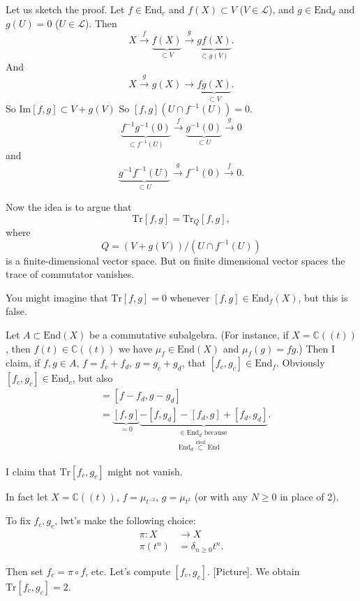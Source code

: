 Let us sketch the proof.
Let $f \in \text{End}_c$ and $f(X) \subset V$ 
($V \in \mathcal{L}$),
and $g \in \text{End}_d$ and $g(U)=0$
($U \in \mathcal{L}$).
Then
$$
X \xrightarrow{f}\underbrace{f(X)}_{\subset V}\xrightarrow{g}
\underbrace{gf(X)}_{\subset g(V)}.
$$
And
$$
X \xrightarrow{g}g(X) \to \underbrace{fg(X)}_{\subset V}.
$$
So $\text{Im}[f,g] \subset V+g(V)$
So $[f,g](U \cap f^{-1}(U))=0$.
$$
\underbrace{f^{-1}g^{-1}(0)}_{\subset f^{-1}(U)}
\xrightarrow{f}\underbrace{g^{-1}(0)}
_{\subset U}\xrightarrow{g}0
$$
and 
$$
\underbrace{g^{-1}f^{-1}(U)}_{\subset U}
\xrightarrow{g}f^{-1}(0)\xrightarrow{f}0.
$$

\noindent
Now the idea is to argue that
$$
\text{Tr}[f,g]=\text{Tr}_Q[f,g],
$$
where
$$
Q=(V+g(V))/(U\cap f^{-1}(U))
$$
is a finite-dimensional vector space.
But on finite dimensional vector spaces
the trace of commutator vanishes.

\medskip\noindent
You might imagine that $\text{Tr}[f,g]=0$
whenever $[f,g]\in \text{End}_f(X)$,
but this is false.

\begin{example}
\label{example-trace-of-commutator-not-vanishing}
Let $A \subset \text{End} (X)$ be a commutative subalgebra.
(For instance, if $X= \mathbb{C}((t))$,
then $f(t) \in \mathbb{C}((t))$
we have $\mu_f \in \text{End}(X)$
and $\mu_f(g)=fg$.)
Then I claim, if $f,g \in A$,
$f=f_c+f_d$,  $g=g_c +g_d$,
that $[f_c,g_c] \in \text{End}_f$.
Obviously  $[f_c,g_c] \in \text{End}_c$,
but also
\begin{align*}
[f_c,g_c]&=[f-f_d,g-g_d]\\
&=\underbrace{[f,g]}_{=0}
\underbrace{-[f,g_d]-[f_d,g]+[f_d,g_d]}_
{\substack{\in\text{End}_d \text{ because }\\\text{End}_d \overset{\text{ideal}}
{\subset} \text{End}}}.
\end{align*}

\noindent
I claim that $\text{Tr}[f_c,g_c]$ might not vanish.

In fact let $X=\mathbb{C}((t))$,
$f=\mu_{t^{-2}}$, $g=\mu_{t^2}$ 
(or with any $N \geq 0$ in place of 2).

To fix $f_c,g_c$, lwt's make the following
choice:
 \begin{align*}
\pi: X &\longrightarrow X \\
\pi(t^n) &= \delta_{n\geq 0}t^n. 
\end{align*}

\noindent
Then set $f_c=\pi \circ f$, etc.
Let's compute $[f_c,g_c]$.
[Picture]. We obtain $\text{Tr}[f_c,g_c]=2$.
\end{example}

